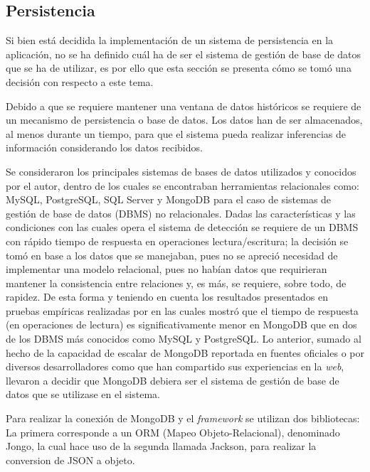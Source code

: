 \subsection{Persistencia}
\label{sec:diseno:persistencia}

Si bien está decidida la implementación de un sistema de persistencia en la aplicación, no se ha definido cuál ha de ser el sistema de gestión de base de datos que se ha de utilizar, es por ello que esta sección se presenta cómo se tomó una decisión con respecto a este tema.

Debido a que se requiere mantener una ventana de datos históricos se requiere de un mecanismo de persistencia o base de datos. Los datos han de ser almacenados, al menos durante un tiempo, para que el sistema pueda realizar inferencias de información considerando los datos recibidos. 

Se consideraron los principales sistemas de bases de datos utilizados y conocidos por el autor, dentro de los cuales se encontraban herramientas relacionales como: MySQL, PostgreSQL, SQL Server y MongoDB para el caso de sistemas de gestión de base de datos (DBMS) no relacionales. Dadas las características y las condiciones con las cuales opera el sistema de detección se requiere de un DBMS con rápido tiempo de respuesta en operaciones lectura/escritura; la decisión se tomó en base a los datos que se manejaban, pues no se apreció necesidad de implementar una modelo relacional, pues no habían datos que requirieran mantener la consistencia entre relaciones y, es más, se requiere, sobre todo, de rapidez. De esta forma y teniendo en cuenta los resultados presentados en pruebas empíricas realizadas por \cite{MongoPerformance} en las cuales mostró que el tiempo de respuesta (en operaciones de lectura) es significativamente menor en MongoDB que en dos de los DBMS más conocidos como MySQL y PostgreSQL. Lo anterior, sumado al hecho de la capacidad de escalar de MongoDB reportada en fuentes oficiales o por diversos desarrolladores como \cite{MongoDBScalability} que han compartido sus experiencias en la \textit{web}, llevaron a decidir que MongoDB debiera ser el sistema de gestión de base de datos que se utilizase en el sistema.

Para realizar la conexión de MongoDB y el \textit{framework} se utilizan dos bibliotecas: La primera corresponde a un ORM (Mapeo Objeto-Relacional), denominado Jongo, la cual hace uso de la segunda llamada Jackson, para realizar la conversion de JSON a objeto.

